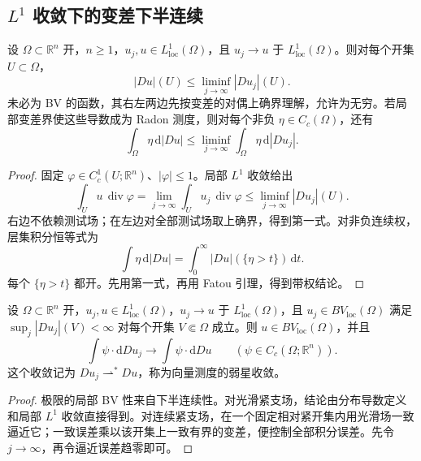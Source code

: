 \subsection{\texorpdfstring{\(L^1\) 收敛下的变差下半连续}{L¹ 收敛下的变差下半连续}}
\label{g3:subsec:2102:02}
\begin{theorem}\label{g3:thm:bv-lower-semicontinuity}
	设 \(\Omega\subset\mathbb R^n\) 开，\(n\ge1\)，\(u_j,u\in L^1_{\mathrm{loc}}(\Omega)\)，且 \(u_j\to u\) 于 \(L^1_{\mathrm{loc}}(\Omega)\)。则对每个开集 \(U\subset\Omega\)，
	\begin{equation}\label{g3:eq:bv-lower-semicontinuity}
		|Du|(U)\le\liminf_{j\to\infty}|Du_j|(U).
	\end{equation}
	未必为 BV 的函数，其右左两边先按变差的对偶上确界理解，允许为无穷。若局部变差界使这些导数成为 Radon 测度，则对每个非负 \(\eta\in C_c(\Omega)\)，还有
	\begin{equation}\label{g3:eq:bv-weighted-lower-semicontinuity}
		\int_\Omega\eta\,\mathrm d|Du|
		\le\liminf_{j\to\infty}\int_\Omega\eta\,\mathrm d|Du_j|.
	\end{equation}
\end{theorem}
\begin{proof}
	固定 \(\varphi\in C_c^1(U;\mathbb R^n)\)、\(|\varphi|\le1\)。局部 \(L^1\) 收敛给出
	\[
		\int_Uu\,\operatorname{div}\varphi
		=\lim_{j\to\infty}\int_Uu_j\,\operatorname{div}\varphi
		\le\liminf_{j\to\infty}|Du_j|(U).
	\]
	右边不依赖测试场；在左边对全部测试场取上确界，得到第一式。对非负连续权，层集积分恒等式为
	\[
		\int\eta\,\mathrm d|Du|=\int_0^\infty |Du|(\{\eta>t\})\,\mathrm dt.
	\]
	每个 \(\{\eta>t\}\) 都开。先用第一式，再用 Fatou 引理，得到带权结论。
\end{proof}

\begin{proposition}\label{g3:prop:bv-derivative-weak-star}
	设 \(\Omega\subset\mathbb R^n\) 开，\(u_j,u\in L^1_{\mathrm{loc}}(\Omega)\)，\(u_j\to u\) 于 \(L^1_{\mathrm{loc}}(\Omega)\)，且 \(u_j\in BV_{\mathrm{loc}}(\Omega)\) 满足 \(\sup_j|Du_j|(V)<\infty\) 对每个开集 \(V\Subset\Omega\) 成立。则 \(u\in BV_{\mathrm{loc}}(\Omega)\)，并且
	\[
		\int\psi\cdot\mathrm dDu_j\longrightarrow
		\int\psi\cdot\mathrm dDu
		\qquad(\psi\in C_c(\Omega;\mathbb R^n)).
	\]
	这个收敛记为 \(Du_j\rightharpoonup^*Du\)，称为向量测度的弱星收敛。
\end{proposition}
\begin{proof}
	极限的局部 BV 性来自下半连续性。对光滑紧支场，结论由分布导数定义和局部 \(L^1\) 收敛直接得到。对连续紧支场，在一个固定相对紧开集内用光滑场一致逼近它；一致误差乘以该开集上一致有界的变差，便控制全部积分误差。先令 \(j\to\infty\)，再令逼近误差趋零即可。
\end{proof}

